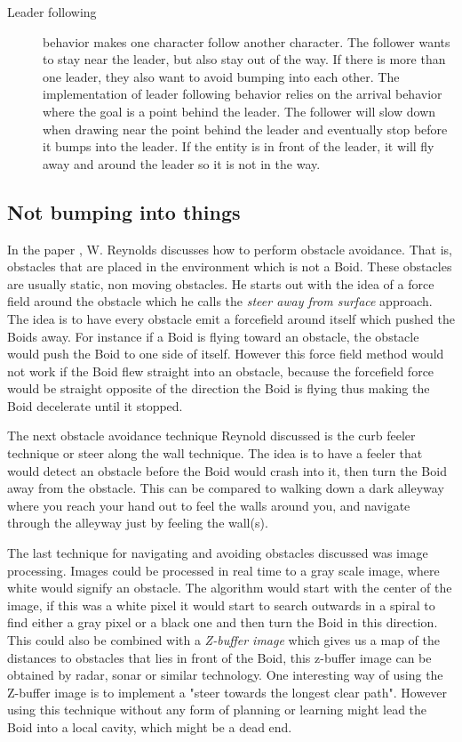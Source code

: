 \begin{description}
\item [Leader following] behavior makes one character follow another character. The follower wants to stay near the leader, but also stay out of the way. If there is more than one leader, they also want to avoid bumping into each other. The implementation of leader following behavior relies on the arrival behavior where the goal is a point behind the leader. The follower will slow down when drawing near the point behind the leader and eventually stop before it bumps into the leader. If the entity is in front of the leader, it will fly away and around the leader so it is not in the way.
\end{description}

\subsection{Not bumping into things}
In the paper \citep{CraigW.Reynolds}, W. Reynolds discusses how to perform obstacle avoidance. That is, obstacles that are placed in the environment which is not a Boid. These obstacles are usually static, non moving obstacles. He starts out with the idea of a force field around the obstacle which he calls the \textit{steer away from surface} approach. The idea is to have every obstacle emit a forcefield around itself which pushed the Boids away. For instance if a Boid is flying toward an obstacle, the obstacle would push the Boid to one side of itself. However this force field method would not work if the Boid flew straight into an obstacle, because the forcefield force would be straight opposite of the direction the Boid is flying thus making the Boid decelerate until it stopped.

The next obstacle avoidance technique Reynold discussed is the curb feeler technique or steer along the wall technique. The idea is to have a feeler that would detect an obstacle before the Boid would crash into it, then turn the Boid away from the obstacle. This can be compared to walking down a dark alleyway where you reach your hand out to feel the walls around you, and navigate through the alleyway just by feeling the wall(s).

The last technique for navigating and avoiding obstacles discussed was image processing. Images could be processed in real time to a gray scale image, where white would signify an obstacle. The algorithm would start with the center of the image, if this was a white pixel it would start to search outwards in a spiral to find either a gray pixel or a black one and then turn the Boid in this direction. This could also be combined with a \textit{Z-buffer image} which gives us a map of the distances to obstacles that lies in front of the Boid, this z-buffer image can be obtained by radar, sonar or similar technology. One interesting way of using the Z-buffer image is to implement a "steer towards the longest clear path". However using this technique without any form of planning or learning might lead the Boid into a local cavity, which might be a dead end.

